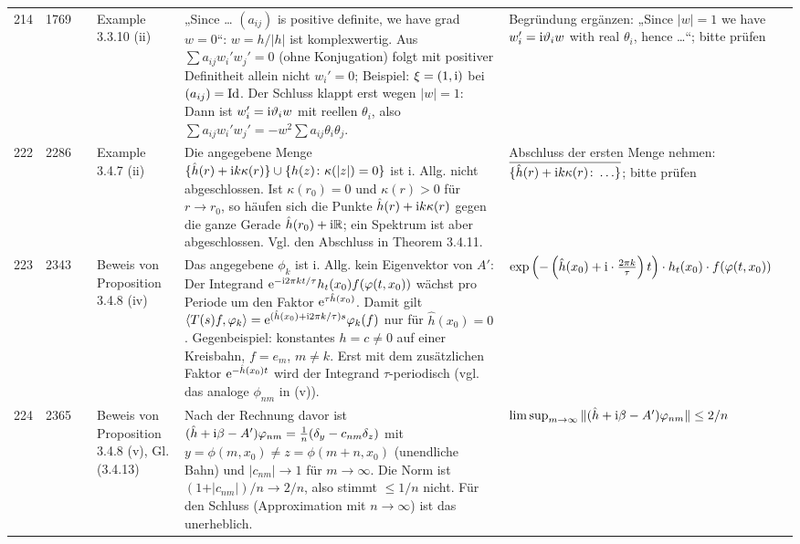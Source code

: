 \documentclass[10pt]{article}
\begin{document}
\begin{longtable}{@{}rrc>{\RaggedRight\arraybackslash}p{3.0cm}>{\RaggedRight\arraybackslash}p{11.4cm}>{\RaggedRight\arraybackslash}p{7.4cm}@{}}
214 & 1769 & \sichC{} & Example 3.3.10 (ii) & „Since \dots{} $(a_{ij})$ is positive definite, we have grad $w = 0$“: $w = h/\vert h\vert$ ist komplexwertig. Aus $\sum a_{ij}w_{i}'w_{j}' = 0$ (ohne Konjugation) folgt mit positiver Definitheit allein nicht $w_{i}' = 0$; Beispiel: $\xi = (1,\mathrm{i})$ bei $(a_{ij}) = \operatorname{Id}$. Der Schluss klappt erst wegen $\vert w\vert = 1$: Dann ist $w_{i}' = \im\theta_{i}w$ mit reellen $\theta_{i}$, also $\sum a_{ij}w_{i}'w_{j}' = -w^{2}\sum a_{ij}\theta_{i}\theta_{j}$. & Begründung ergänzen: „Since $\vert w\vert = 1$ we have $w_{i}' = \im\theta_{i}w$ with real $\theta_{i}$, hence \dots{}“; bitte prüfen \\[2pt]
222 & 2286 & \sichC{} & Example 3.4.7 (ii) & Die angegebene Menge $\{\hat{h}(r) + \mathrm{i} k\kappa(r)\} \cup \{h(z) \colon \kappa(\vert z\vert) = 0\}$ ist i. Allg. nicht abgeschlossen. Ist $\kappa(r_{0}) = 0$ und $\kappa(r) > 0$ für $r \to r_{0}$, so häufen sich die Punkte $\hat{h}(r) + \mathrm{i} k\kappa(r)$ gegen die ganze Gerade $\hat{h}(r_{0}) + \mathrm{i}\mathbb{R}$; ein Spektrum ist aber abgeschlossen. Vgl. den Abschluss in Theorem 3.4.11. & Abschluss der ersten Menge nehmen: $\overline{\{\hat{h}(r) + \mathrm{i} k\kappa(r) \colon \ldots\}}$; bitte prüfen \\[2pt]
223 & 2343 & \sichA{} & Beweis von Proposition 3.4.8 (iv) & Das angegebene $\phi_{k}$ ist i. Allg. kein Eigenvektor von $A'$: Der Integrand $\eu^{-\im 2\pi kt/\tau}h_{t}(x_{0})f(\phi(t,x_{0}))$ wächst pro Periode um den Faktor $\mathrm{e}^{\tau\hat{h}(x_{0})}$. Damit gilt $\langle T(s)f,\phi_{k}\rangle = \eu^{(\hat{h}(x_0)+\im 2\pi k/\tau)s}\phi_{k}(f)$ nur für $\hat{h}(x_{0}) = 0$. Gegenbeispiel: konstantes $h = c \neq 0$ auf einer Kreisbahn, $f = e_{m}$, $m \neq k$. Erst mit dem zusätzlichen Faktor $\mathrm{e}^{-\hat{h}(x_{0})t}$ wird der Integrand $\ensuremath{\tau}$-periodisch (vgl. das analoge $\phi_{nm}$ in (v)). & $\exp\left(-\left(\hat{h}(x_{0}) + \im\cdot\frac{2\pi k}{\tau}\right) t\right)\cdot h_{t}(x_{0})\cdot f(\phi(t,x_{0}))$ \\[2pt]
224 & 2365 & \sichA{} & Beweis von Proposition 3.4.8 (v), Gl. (3.4.13) & Nach der Rechnung davor ist $(\hat{h}+\im\beta - A')\phi_{nm} = \frac{1}{n}(\delta_{y} - c_{nm}\delta_{z})$ mit $y = \phi(m,x_{0}) \neq z = \phi(m+n,x_{0})$ (unendliche Bahn) und $\vert c_{nm}\vert \to 1$ für $m \to \infty$. Die Norm ist $(1 + \vert c_{nm}\vert)/n \to 2/n$, also stimmt $\leq 1/n$ nicht. Für den Schluss (Approximation mit $n \ensuremath{\to} \ensuremath{\infty}$) ist das unerheblich. & $\limsup_{m\to\infty} \|(\hat{h}+\im\beta -A')\phi_{nm}\| \leq 2/n$ \\
\end{longtable}
\end{document}

